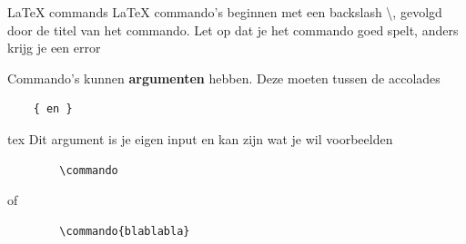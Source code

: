 \copyrightTim

\begin{frame}[fragile]{LaTeX commands}
    LaTeX commando's beginnen met een backslash \textbackslash, gevolgd door de titel van het commando.
\pause
\newline
    Let op dat je het commando goed spelt, anders krijg je een error
    
\newline
    \pause
    Commando's kunnen \textbf{argumenten} hebben. Deze moeten tussen de accolades \begin{verbatim} 
    { en } 
    \end{verbatim}{tex}
\pause
\newline
    Dit argument is je eigen input en kan zijn wat je wil
    \pause
    \newline
    voorbeelden

    \begin{verbatim}
        \commando
    \end{verbatim}
    of
    \begin{verbatim}
        \commando{blablabla}
    \end{verbatim}

\end{frame}